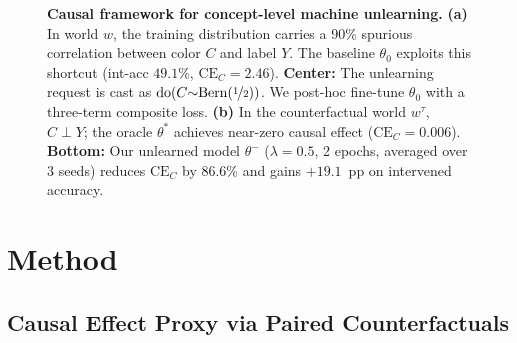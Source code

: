 \documentclass{article}
\newcommand{\doop}{\mathrm{do}}
\newcommand{\CE}{\mathrm{CE}}
\newcommand{\Dfid}{\mathcal{D}_{\mathrm{fid}}}
\begin{document}
\begin{figure}[t]
\caption{%
  \textbf{Causal framework for concept-level machine unlearning.}
  \textbf{(a)} In world $w$, the training distribution carries a 90\% spurious
  correlation between color $C$ and label $Y$.  The baseline $\theta_0$
  exploits this shortcut (int-acc $49.1\%$, $\CE_C{=}2.46$).
  \textbf{Center:} The unlearning request is cast as
  $\doop(C{\sim}\mathrm{Bern}(\nicefrac{1}{2}))$.  We post-hoc fine-tune
  $\theta_0$ with a three-term composite loss.
  \textbf{(b)} In the counterfactual world $w^\tau$, $C\!\perp\!Y$; the oracle
  $\theta^*$ achieves near-zero causal effect ($\CE_C{=}0.006$).
  \textbf{Bottom:} Our unlearned model $\theta^-$ ($\lambda{=}0.5$, 2 epochs,
  averaged over 3 seeds) reduces $\CE_C$ by 86.6\% and gains $+19.1$~pp on
  intervened accuracy.
}
\label{fig:concept}
\end{figure}


\section{Method}
\label{sec:method}

\subsection{Causal Effect Proxy via Paired Counterfactuals}
\end{document}
